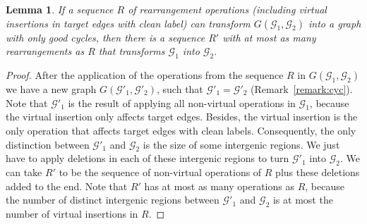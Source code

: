 \documentclass[12pt]{article}
\newtheorem{lemma}[theorem]{Lemma}
\begin{document}
\vspace{8pt}
\begin{lemma}
If a sequence $R$ of rearrangement operations (including virtual insertions in target edges with clean label) can transform $G(\mathcal{G}_1,\mathcal{G}_2)$ into a graph with only good cycles, then there is a sequence $R'$ with at most as many rearrangements as $R$ that transforms $\mathcal{G}_1$ into $\mathcal{G}_2$.
\end{lemma}

\begin{proof}
After the application of the operations from the sequence $R$ in $G(\mathcal{G}_1,\mathcal{G}_2)$ we have a new graph $G(\mathcal{G}'_1,\mathcal{G}'_2)$, such that $\mathcal{G}'_1 = \mathcal{G}'_2$ (Remark~\ref{remark:cyc}). Note that $\mathcal{G}'_1$ is the result of applying all non-virtual operations in $\mathcal{G}_1$, because the virtual insertion only affects target edges. Besides, the virtual insertion is the only operation that affects target edges with clean labels. Consequently, the only distinction between $\mathcal{G}'_1$ and $\mathcal{G}_2$ is the size of some intergenic regions. We just have to apply deletions in each of these intergenic regions to turn $\mathcal{G}'_1$ into $\mathcal{G}_2$. We can take $R'$ to be the sequence of non-virtual operations of $R$ plus these deletions added to the end. Note that $R'$ has at most as many operations as $R$, because the number of distinct intergenic regions between $\mathcal{G}'_1$ and $\mathcal{G}_2$ is at most the number of virtual insertions in $R$.
\end{proof}
\end{document}
